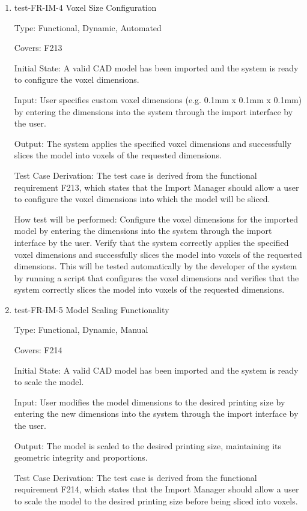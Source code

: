 \documentclass[12pt, titlepage]{article}
\begin{document}
\begin{enumerate}

\item{test-FR-IM-4 Voxel Size Configuration\\}

Type: Functional, Dynamic, Automated

Covers: F213
					
Initial State: A valid CAD model has been imported and the system is ready to configure the voxel dimensions.
					
Input: User specifies custom voxel dimensions (e.g. 0.1mm x 0.1mm x 0.1mm) by entering the dimensions into the system through the import interface by the user.
					
Output: The system applies the specified voxel dimensions and successfully slices the model into voxels of the requested dimensions.

Test Case Derivation: The test case is derived from the functional requirement F213, which states that the Import Manager should allow a user to configure the voxel dimensions into which the model will be sliced.
					
How test will be performed: Configure the voxel dimensions for the imported model by entering the dimensions into the system through the import interface by the user. Verify that the system correctly applies the specified voxel dimensions and successfully slices the model into voxels of the requested dimensions. This will be tested automatically by the developer of the system by running a script that configures the voxel dimensions and verifies that the system correctly slices the model into voxels of the requested dimensions.

\item{test-FR-IM-5 Model Scaling Functionality\\}

Type: Functional, Dynamic, Manual

Covers: F214
					
Initial State: A valid CAD model has been imported and the system is ready to scale the model.
					
Input: User modifies the model dimensions to the desired printing size by entering the new dimensions into the system through the import interface by the user.
					
Output: The model is scaled to the desired printing size, maintaining its geometric integrity and proportions.

Test Case Derivation: The test case is derived from the functional requirement F214, which states that the Import Manager should allow a user to scale the model to the desired printing size before being sliced into voxels.
					

\end{enumerate}
\end{document}
